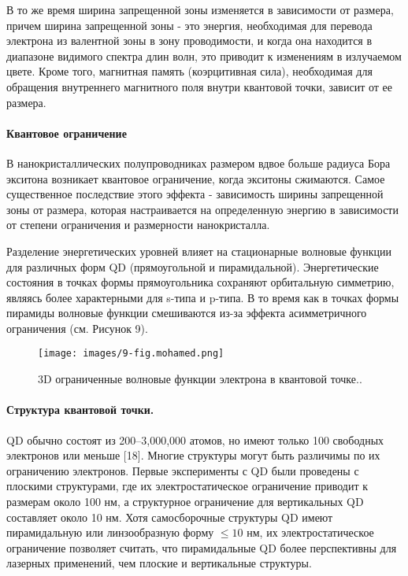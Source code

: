 \documentclass[a4paper,14pt]{extarticle}
\begin{document}
В то же время ширина запрещенной зоны изменяется в зависимости от размера, причем ширина запрещенной зоны - это энергия, необходимая для перевода электрона из валентной зоны в зону проводимости, и когда она находится в диапазоне видимого спектра длин волн, это приводит к изменениям в излучаемом цвете. Кроме того, магнитная память (коэрцитивная сила), необходимая для обращения внутреннего магнитного поля внутри квантовой точки, зависит от ее размера.

\paragraph{Квантовое ограничение}

В нанокристаллических полупроводниках размером вдвое больше радиуса Бора экситона возникает квантовое ограничение, когда экситоны сжимаются. Самое существенное последствие этого эффекта - зависимость ширины запрещенной зоны от размера, которая настраивается на определенную энергию в зависимости от степени ограничения и размерности нанокристалла.

Разделение энергетических уровней влияет на стационарные волновые функции для различных форм QD (прямоугольной и пирамидальной). Энергетические состояния в точках формы прямоугольника сохраняют орбитальную симметрию, являясь более характерными для s-типа и p-типа. В то время как в точках формы пирамиды волновые функции смешиваются из-за эффекта асимметричного ограничения (см. Рисунок 9).

\begin{figure}[htbp]
    \centering
    \texttt{[image: images/9-fig.mohamed.png]}
    \caption{\label{fig:mohamed7} 3D ограниченные волновые функции электрона в квантовой точке.\cite{mohamed}.}
\end{figure}

\paragraph{Структура квантовой точки.}

QD обычно состоят из 200–3,000,000 атомов, но имеют только 100 свободных электронов или меньше [18]. Многие структуры могут быть различимы по их ограничению электронов. Первые эксперименты с QD были проведены с плоскими структурами, где их электростатическое ограничение приводит к размерам около 100 нм, а структурное ограничение для вертикальных QD составляет около 10 нм. Хотя самосборочные структуры QD имеют пирамидальную или линзообразную форму \( \leq 10 \) нм, их электростатическое ограничение позволяет считать, что пирамидальные QD более перспективны для лазерных применений, чем плоские и вертикальные структуры.
\end{document}
